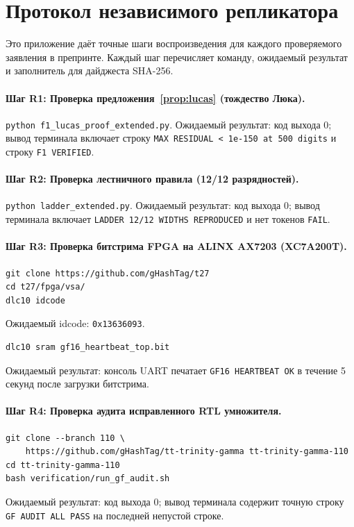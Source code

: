 \documentclass[11pt,a4paper]{article}
\theoremstyle{plain}
\begin{document}
\section{Протокол независимого репликатора}\label{app:replicator}

Это приложение даёт точные шаги воспроизведения для каждого проверяемого
заявления в препринте. Каждый шаг перечисляет команду, ожидаемый результат и
заполнитель для дайджеста SHA-256.

\paragraph{Шаг R1: Проверка предложения~\ref{prop:lucas} (тождество Люка).}
\texttt{python f1\_lucas\_proof\_extended.py}.
Ожидаемый результат: код выхода 0; вывод терминала включает строку
\texttt{MAX RESIDUAL < 1e-150 at 500 digits} и строку
\texttt{F1 VERIFIED}.

\paragraph{Шаг R2: Проверка лестничного правила (12/12 разрядностей).}
\texttt{python ladder\_extended.py}.
Ожидаемый результат: код выхода 0; вывод терминала включает
\texttt{LADDER 12/12 WIDTHS REPRODUCED} и нет токенов \texttt{FAIL}.

\paragraph{Шаг R3: Проверка битстрима FPGA на ALINX AX7203 (XC7A200T).}
\begin{lstlisting}
git clone https://github.com/gHashTag/t27
cd t27/fpga/vsa/
dlc10 idcode
\end{lstlisting}
Ожидаемый idcode: \texttt{0x13636093}.
\begin{lstlisting}
dlc10 sram gf16_heartbeat_top.bit
\end{lstlisting}
Ожидаемый результат: консоль UART печатает \texttt{GF16 HEARTBEAT OK} в течение
5 секунд после загрузки битстрима.

\paragraph{Шаг R4: Проверка аудита исправленного RTL умножителя.}
\begin{lstlisting}
git clone --branch 110 \
    https://github.com/gHashTag/tt-trinity-gamma tt-trinity-gamma-110
cd tt-trinity-gamma-110
bash verification/run_gf_audit.sh
\end{lstlisting}
Ожидаемый результат: код выхода 0; вывод терминала содержит точную строку
\texttt{GF AUDIT ALL PASS} на последней непустой строке.
\end{document}
